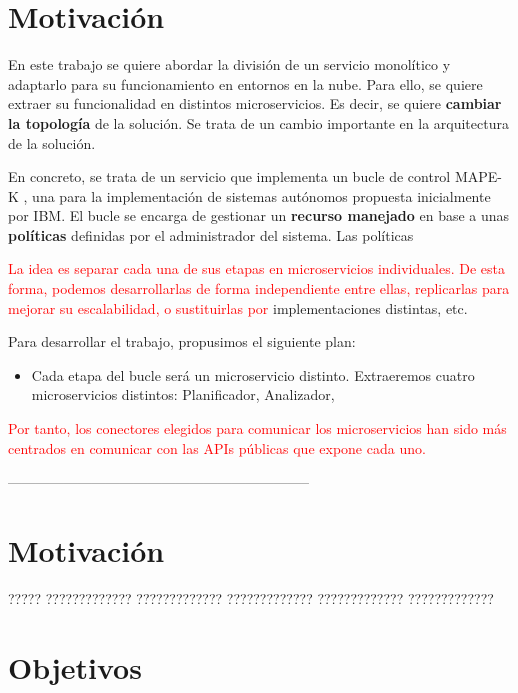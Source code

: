 \section{Motivación}

En este trabajo se quiere abordar la división de un servicio monolítico y adaptarlo para su funcionamiento en entornos en la nube. Para ello, se quiere extraer su funcionalidad en distintos microservicios. Es decir, se quiere \textbf{cambiar la topología} de la solución. Se trata de un cambio importante en la arquitectura de la solución.

En concreto, se trata de un servicio que implementa un bucle de control MAPE-K \cite{ibmcorporationArchitecturalBlueprintAutonomic2006, fonsServiciosAdaptivereadyPara2021}, una para la implementación de sistemas autónomos propuesta inicialmente por IBM. El bucle se encarga de gestionar un \textbf{recurso manejado} en base a unas \textbf{políticas} definidas por el administrador del sistema. Las políticas


\textcolor{red}{La idea es separar cada una de sus etapas en microservicios individuales. De esta forma, podemos desarrollarlas de forma independiente entre ellas, replicarlas para mejorar su escalabilidad, o sustituirlas por }implementaciones distintas, etc.

Para desarrollar el trabajo, propusimos el siguiente plan:
\begin{itemize}
  \item Cada etapa del bucle será un microservicio distinto. Extraeremos cuatro microservicios distintos: Planificador, Analizador,
\end{itemize}

\textcolor{red}{Por tanto, los conectores elegidos para comunicar los microservicios han sido más centrados en comunicar con las APIs públicas que expone cada uno.}

-----------------------------------------------------------------

\section{Motivación}

????? ????????????? ????????????? ????????????? ????????????? ?????????????

\section{Objetivos}


